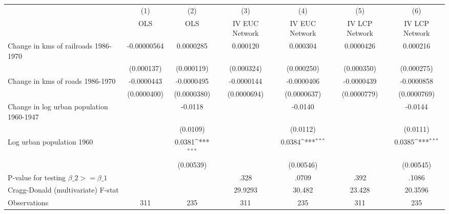 {
\def\sym#1{\ifmmode^{#1}\else\(^{#1}\)\fi}
\begin{tabular}{l*{6}{c}}
\hline\hline
                &\multicolumn{1}{c}{(1)}&\multicolumn{1}{c}{(2)}&\multicolumn{1}{c}{(3)}&\multicolumn{1}{c}{(4)}&\multicolumn{1}{c}{(5)}&\multicolumn{1}{c}{(6)}\\
                &\multicolumn{1}{c}{OLS}&\multicolumn{1}{c}{OLS}&\multicolumn{1}{c}{IV EUC Network}&\multicolumn{1}{c}{IV EUC Network}&\multicolumn{1}{c}{IV LCP Network}&\multicolumn{1}{c}{IV LCP Network}\\
\hline
Change in kms of railroads 1986-1970&-0.00000564         &0.0000285         & 0.000120         & 0.000304         &0.0000426         & 0.000216         \\
                &(0.000137)         &(0.000119)         &(0.000324)         &(0.000250)         &(0.000350)         &(0.000275)         \\
[1em]
Change in kms of roads 1986-1970&-0.0000443         &-0.0000495         &-0.0000144         &-0.0000406         &-0.0000439         &-0.0000858         \\
                &(0.0000400)         &(0.0000380)         &(0.0000694)         &(0.0000637)         &(0.0000779)         &(0.0000769)         \\
[1em]
Change in log urban population 1960-1947&                  &  -0.0118         &                  &  -0.0140         &                  &  -0.0144         \\
                &                  & (0.0109)         &                  & (0.0112)         &                  & (0.0111)         \\
[1em]
Log urban population 1960&                  &   0.0381\sym{***}&                  &   0.0384\sym{***}&                  &   0.0385\sym{***}\\
                &                  &(0.00539)         &                  &(0.00546)         &                  &(0.00545)         \\
\hline
P-value for testing $\beta\_{2} >= \beta\_{1}$&                  &                  &     .328         &    .0709         &     .392         &    .1086         \\
Cragg-Donald (multivariate) F-stat&                  &                  &  29.9293         &   30.482         &   23.428         &  20.3596         \\
Observations    &      311         &      235         &      311         &      235         &      311         &      235         \\
\hline\hline
\end{tabular}
}
